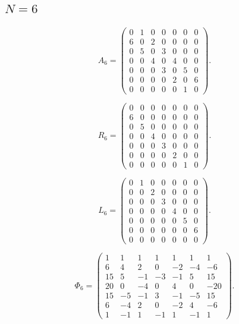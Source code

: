 \subsection{$N=6$}
\label{tab:matrices-N06}
\begingroup
\small
\setlength{\arraycolsep}{3pt}
\[
A_{6}=\begin{pmatrix}
0 & 1 & 0 & 0 & 0 & 0 & 0 \\
6 & 0 & 2 & 0 & 0 & 0 & 0 \\
0 & 5 & 0 & 3 & 0 & 0 & 0 \\
0 & 0 & 4 & 0 & 4 & 0 & 0 \\
0 & 0 & 0 & 3 & 0 & 5 & 0 \\
0 & 0 & 0 & 0 & 2 & 0 & 6 \\
0 & 0 & 0 & 0 & 0 & 1 & 0
\end{pmatrix}.
\]
\endgroup

\begingroup
\small
\setlength{\arraycolsep}{3pt}
\[
R_{6}=\begin{pmatrix}
0 & 0 & 0 & 0 & 0 & 0 & 0 \\
6 & 0 & 0 & 0 & 0 & 0 & 0 \\
0 & 5 & 0 & 0 & 0 & 0 & 0 \\
0 & 0 & 4 & 0 & 0 & 0 & 0 \\
0 & 0 & 0 & 3 & 0 & 0 & 0 \\
0 & 0 & 0 & 0 & 2 & 0 & 0 \\
0 & 0 & 0 & 0 & 0 & 1 & 0
\end{pmatrix}.
\]
\endgroup

\begingroup
\small
\setlength{\arraycolsep}{3pt}
\[
L_{6}=\begin{pmatrix}
0 & 1 & 0 & 0 & 0 & 0 & 0 \\
0 & 0 & 2 & 0 & 0 & 0 & 0 \\
0 & 0 & 0 & 3 & 0 & 0 & 0 \\
0 & 0 & 0 & 0 & 4 & 0 & 0 \\
0 & 0 & 0 & 0 & 0 & 5 & 0 \\
0 & 0 & 0 & 0 & 0 & 0 & 6 \\
0 & 0 & 0 & 0 & 0 & 0 & 0
\end{pmatrix}.
\]
\endgroup

\begingroup
\small
\setlength{\arraycolsep}{3pt}
\[
\Phi_{6}=\begin{pmatrix}
1 & 1 & 1 & 1 & 1 & 1 & 1 \\
6 & 4 & 2 & 0 & -2 & -4 & -6 \\
15 & 5 & -1 & -3 & -1 & 5 & 15 \\
20 & 0 & -4 & 0 & 4 & 0 & -20 \\
15 & -5 & -1 & 3 & -1 & -5 & 15 \\
6 & -4 & 2 & 0 & -2 & 4 & -6 \\
1 & -1 & 1 & -1 & 1 & -1 & 1
\end{pmatrix}.
\]
\endgroup

